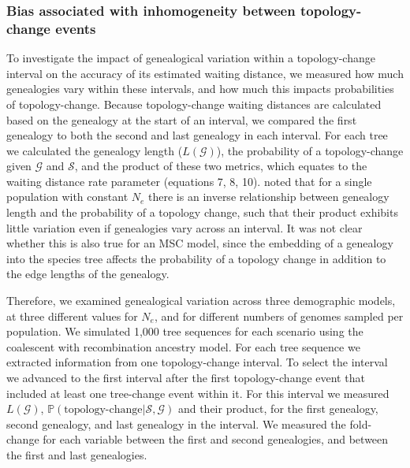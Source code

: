 \documentclass[11pt]{article}
\begin{document}
\subsubsection{Bias associated with inhomogeneity between topology-change events}

To investigate the impact of genealogical variation within a topology-change interval
on the accuracy of its estimated waiting distance, we measured how much genealogies vary
within these intervals, and how much this impacts probabilities of topology-change.
% 
Because topology-change waiting distances are calculated based on the genealogy
at the start of an interval, we compared the first genealogy to both the second
and last genealogy in each interval.
% 
For each tree we calculated the genealogy length ($L(\mathcal{G})$), 
the probability of a topology-change given $\mathcal{G}$ and $\mathcal{S}$,
and the product of these two metrics, which equates to the waiting distance 
rate parameter (equations 7, 8, 10).
% 
\citet{deng_distribution_2021} noted that for a single population with constant $N_e$
there is an inverse relationship between genealogy length and the probability of a 
topology change, such that their product exhibits little variation even if genealogies
vary across an interval.
% 
It was not clear whether this is also true for an MSC model, since the embedding of
a genealogy into the species tree affects the probability of a topology change in 
addition to the edge lengths of the genealogy. 
% 


Therefore, we examined genealogical variation across three demographic models, 
at three different values for $N_e$, and for different numbers of genomes sampled
per population. We simulated 1,000 tree sequences for each scenario using the 
coalescent with recombination ancestry model. 
% 
For each tree sequence we extracted information from one topology-change interval. 
To select the interval we advanced to the first interval after the first topology-change 
event that included at least one tree-change event within it.
For this interval we measured $L(\mathcal{G})$, 
$\mathbb{P}(\textrm{topology-change}| \mathcal{S}, \mathcal{G})$ and their
product, for the first genealogy, second genealogy, and last genealogy in the interval.
We measured the fold-change for each variable between the first and second 
genealogies, and between the first and last genealogies.
% 
\end{document}

